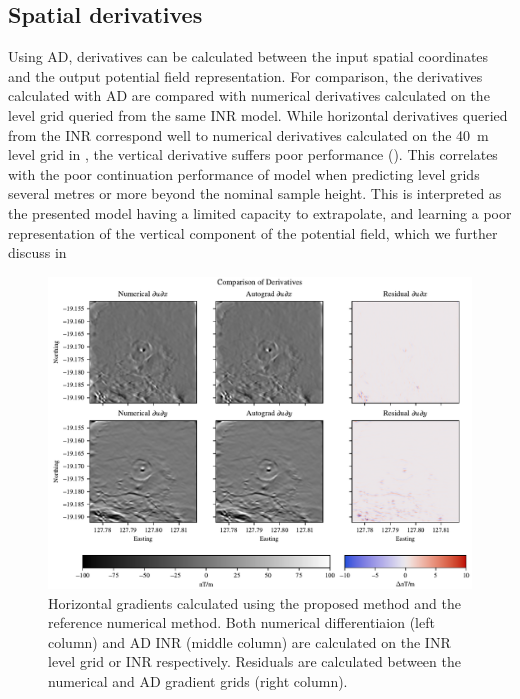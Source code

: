 


\subsection{Spatial derivatives}
Using AD, derivatives can be calculated between the input spatial coordinates and the output potential field representation.
For comparison, the derivatives calculated with AD are compared with numerical derivatives calculated on the level grid queried from the same INR model.
While horizontal derivatives queried from the INR correspond well to numerical derivatives calculated on the \qty{40}{\m} level grid in , the vertical derivative suffers poor performance ().
This correlates with the poor continuation performance of model when predicting level grids several metres or more beyond the nominal sample height.
This is interpreted as the presented model having a limited capacity to extrapolate, and learning a poor representation of the vertical component of the potential field, which we further discuss in 
\begin{figure}[hbt]
    \centering{}
    \includegraphics[width=1.0\linewidth]{fig/p3/P864_dh_comparison.pdf}
    \caption[Horizontal derivatives]{Horizontal gradients calculated using the proposed method and the reference numerical method.
        Both numerical differentiaion (left column) and AD INR (middle column) are calculated on the INR level grid or INR respectively.
        Residuals are calculated between the numerical and AD gradient grids (right column).}
    \label{fig:horigrad}
\end{figure}

